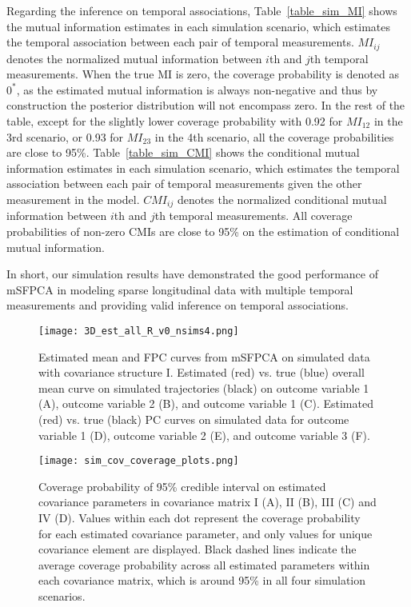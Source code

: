 \documentclass[aoas,preprint]{imsart}
\begin{document}
Regarding the inference on temporal associations, Table~\ref{table_sim_MI} shows the mutual information estimates in each simulation scenario, which estimates the temporal association between each pair of temporal measurements. $MI_{ij}$ denotes the normalized mutual information between $i$th and $j$th temporal measurements. When the true MI is zero, the coverage probability is denoted as $0^*$, as the estimated mutual information is always non-negative and thus by construction the posterior distribution will not encompass zero. In the rest of the table, except for the slightly lower coverage probability with 0.92 for $MI_{12}$ in the 3rd scenario, or 0.93 for $MI_{23}$ in the 4th scenario, all the coverage probabilities are close to 95\%. Table~\ref{table_sim_CMI} shows the conditional mutual information estimates in each simulation scenario, which estimates the temporal association between each pair of temporal measurements given the other measurement in the model. $CMI_{ij}$ denotes the normalized conditional mutual information between $i$th and $j$th temporal measurements. All coverage probabilities of non-zero CMIs are close to 95\% on the estimation of conditional mutual information. 

In short, our simulation results have demonstrated the good performance of mSFPCA in modeling sparse longitudinal data with multiple temporal measurements and providing valid inference on temporal associations.

\begin{figure}
\texttt{[image: 3D\_est\_all\_R\_v0\_nsims4.png]}
\caption{Estimated mean and FPC curves from mSFPCA on simulated data with covariance structure I. Estimated (red) vs. true (blue) overall mean curve on simulated trajectories (black) on outcome variable 1 (A), outcome variable 2 (B), and outcome variable 1 (C). Estimated (red) vs. true (black) PC curves on simulated data for outcome variable 1 (D), outcome variable 2 (E), and outcome variable 3 (F).}
\label{sim_curves}
\end{figure}

\begin{figure}
\texttt{[image: sim\_cov\_coverage\_plots.png]}
\caption{Coverage probability of 95\% credible interval on estimated covariance parameters in covariance matrix I (A), II (B), III (C) and IV (D). Values within each dot represent the coverage probability for each estimated covariance parameter, and only values for unique covariance element are displayed. Black dashed lines indicate the average coverage probability across all estimated parameters within each covariance matrix, which is around 95\% in all four simulation scenarios.}
\label{sim_cov_prob}
\end{figure}
\end{document}
